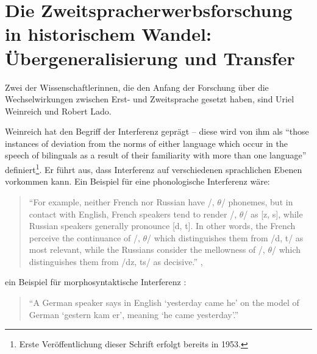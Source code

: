 \section{Die Zweitspracherwerbsforschung in historischem Wandel: Übergeneralisierung und Transfer}

Zwei der Wissenschaftlerinnen, die den Anfang der Forschung über die Wechselwirkungen zwischen Erst- und Zweitsprache gesetzt haben, sind Uriel Weinreich und Robert Lado.

Weinreich hat den Begriff der Interferenz geprägt --
diese wird von ihm als ``those instances of deviation from the norms of either language which occur in the speech of bilinguals as a result of their familiarity with more than one language'' \cite{Weinreich79}
definiert\footnote{Erste Veröffentlichung dieser Schrift erfolgt bereits in 1953.}.
Er führt aus, dass Interferenz auf verschiedenen sprachlichen Ebenen vorkommen kann.
Ein Beispiel für eine phonologische Interferenz wäre:
\begin{quote}
``For example, neither French nor Russian have /, $\theta$/ phonemes, but in contact
    with English, French speakers tend to render /, $\theta$/ as [z, s], while Russian
    speakers generally pronounce [d, t].
    In other words, the French perceive the continuance of /, $\theta$/ which distinguishes them from /d, t/ as most relevant, while
    the Russians consider the mellowness of /, $\theta$/ which distinguishes them from /dz, ts/ as decisive.''
\cite{Weinreich79},
\end{quote}
ein Beispiel für morphosyntaktische Interferenz :
\begin{quote}
``A German speaker says in English `yesterday came he' on the model of German
`gestern kam er', meaning `he came yesterday'.''
\cite{Weinreich79}
\end{quote}





